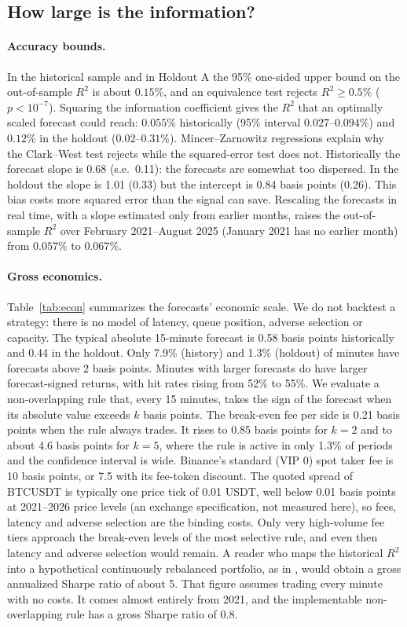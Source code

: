 \documentclass[11pt]{article}
\begin{document}
\subsection{How large is the information?}
\paragraph{Accuracy bounds.} In the historical sample and in Holdout A the 95\% one-sided upper bound on the out-of-sample $R^2$ is about $0.15\%$, and an equivalence test rejects $R^2\ge0.5\%$ ($p<10^{-7}$). Squaring the information coefficient gives the $R^2$ that an optimally scaled forecast could reach: $0.055\%$ historically (95\% interval $0.027$--$0.094\%$) and $0.12\%$ in the holdout ($0.02$--$0.31\%$). Mincer--Zarnowitz regressions explain why the Clark--West test rejects while the squared-error test does not. Historically the forecast slope is 0.68 (s.e.\ 0.11): the forecasts are somewhat too dispersed. In the holdout the slope is 1.01 (0.33) but the intercept is 0.84 basis points (0.26). This bias costs more squared error than the signal can save. Rescaling the forecasts in real time, with a slope estimated only from earlier months, raises the out-of-sample $R^2$ over February 2021--August 2025 (January 2021 has no earlier month) from $0.057\%$ to $0.067\%$.

\paragraph{Gross economics.} Table~\ref{tab:econ} summarizes the forecasts' economic scale. We do not backtest a strategy: there is no model of latency, queue position, adverse selection or capacity. The typical absolute 15-minute forecast is 0.58 basis points historically and 0.44 in the holdout. Only 7.9\% (history) and 1.3\% (holdout) of minutes have forecasts above 2 basis points. Minutes with larger forecasts do have larger forecast-signed returns, with hit rates rising from 52\% to 55\%. We evaluate a non-overlapping rule that, every 15 minutes, takes the sign of the forecast when its absolute value exceeds $k$ basis points. The break-even fee per side is 0.21 basis points when the rule always trades. It rises to 0.85 basis points for $k=2$ and to about 4.6 basis points for $k=5$, where the rule is active in only 1.3\% of periods and the confidence interval is wide. Binance's standard (VIP 0) spot taker fee is 10 basis points, or 7.5 with its fee-token discount. The quoted spread of BTCUSDT is typically one price tick of 0.01 USDT, well below 0.01 basis points at 2021--2026 price levels (an exchange specification, not measured here), so fees, latency and adverse selection are the binding costs. Only very high-volume fee tiers approach the break-even levels of the most selective rule, and even then latency and adverse selection would remain. A reader who maps the historical $R^2$ into a hypothetical continuously rebalanced portfolio, as in \citet{campbellthompson2008}, would obtain a gross annualized Sharpe ratio of about 5. That figure assumes trading every minute with no costs. It comes almost entirely from 2021, and the implementable non-overlapping rule has a gross Sharpe ratio of 0.8.
\end{document}

